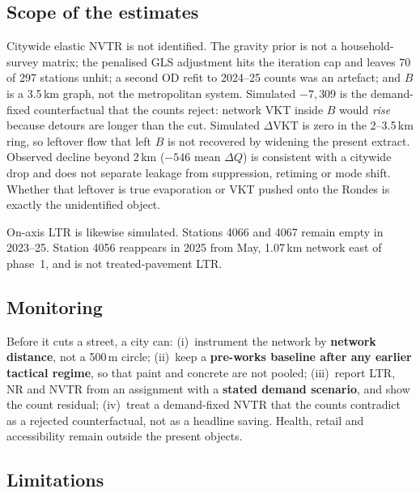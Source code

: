 \documentclass[a4paper,fleqn]{cas-dc}
\newcommand{\DQ}{\Delta Q}
\newcommand{\DVKT}{\Delta\mathrm{VKT}}
\begin{document}
\subsection{Scope of the estimates}

Citywide elastic NVTR is not identified. The gravity prior is not a
household-survey matrix; the penalised GLS adjustment hits the iteration cap
and leaves 70 of 297 stations unhit; a second OD refit to 2024--25 counts was
an artefact; and $B$ is a 3.5\,km graph, not the metropolitan system.
Simulated $-7{,}309$ is the demand-fixed counterfactual that the counts
reject: network VKT inside $B$ would \emph{rise} because detours are longer
than the cut. Simulated $\DVKT$ is zero in the 2--3.5\,km ring, so leftover flow
that left $B$ is not recovered by widening the present extract. Observed
decline beyond 2\,km ($-546$ mean $\DQ$) is consistent with a citywide drop
and does not separate leakage from suppression, retiming or mode shift.
Whether that leftover is true evaporation or VKT pushed onto the Rondes is
exactly the unidentified object.

On-axis LTR is likewise simulated. Stations 4066 and 4067 remain empty in
2023--25. Station 4056 reappears in 2025 from May, 1.07\,km network east of
phase~1, and is not treated-pavement LTR.

\subsection{Monitoring}

Before it cuts a street, a city can: (i)~instrument the network by
\textbf{network distance}, not a 500\,m circle; (ii)~keep a \textbf{pre-works
baseline after any earlier tactical regime}, so that paint and concrete are
not pooled; (iii)~report LTR, NR and NVTR from an assignment with a
\textbf{stated demand scenario}, and show the count residual; (iv)~treat a
demand-fixed NVTR that the counts contradict as a rejected counterfactual, not
as a headline saving. Health, retail and accessibility remain outside the
present objects.

\subsection{Limitations}
\end{document}
